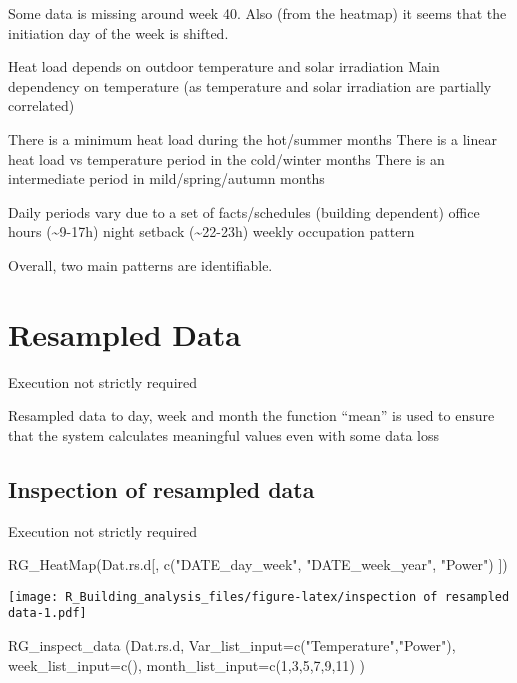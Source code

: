 \documentclass[
]{article}
\newenvironment{Shaded}{\begin{snugshade}}{\end{snugshade}}
\newcommand{\AttributeTok}[1]{\textcolor[rgb]{0.77,0.63,0.00}{#1}}
\newcommand{\DecValTok}[1]{\textcolor[rgb]{0.00,0.00,0.81}{#1}}
\newcommand{\FunctionTok}[1]{\textcolor[rgb]{0.00,0.00,0.00}{#1}}
\newcommand{\NormalTok}[1]{#1}
\newcommand{\StringTok}[1]{\textcolor[rgb]{0.31,0.60,0.02}{#1}}
\begin{document}
Some data is missing around week 40. Also (from the heatmap) it seems
that the initiation day of the week is shifted.

Heat load depends on outdoor temperature and solar irradiation Main
dependency on temperature (as temperature and solar irradiation are
partially correlated)

There is a minimum heat load during the hot/summer months There is a
linear heat load vs temperature period in the cold/winter months There
is an intermediate period in mild/spring/autumn months

Daily periods vary due to a set of facts/schedules (building dependent)
office hours (\textasciitilde9-17h) night setback
(\textasciitilde22-23h) weekly occupation pattern

Overall, two main patterns are identifiable.

\hypertarget{resampled-data}{%
\section{Resampled Data}\label{resampled-data}}

Execution not strictly required

Resampled data to day, week and month the function ``mean'' is used to
ensure that the system calculates meaningful values even with some data
loss

\hypertarget{inspection-of-resampled-data}{%
\subsection{Inspection of resampled
data}\label{inspection-of-resampled-data}}

Execution not strictly required

\begin{Shaded}
\begin{Highlighting}[]
  \FunctionTok{RG\_HeatMap}\NormalTok{(Dat.rs.d[,}
                      \FunctionTok{c}\NormalTok{(}\StringTok{"DATE\_day\_week"}\NormalTok{,}
                        \StringTok{"DATE\_week\_year"}\NormalTok{,}
                        \StringTok{"Power"}\NormalTok{)}
\NormalTok{  ])}
\end{Highlighting}
\end{Shaded}

\texttt{[image: R\_Building\_analysis\_files/figure-latex/inspection of resampled data-1.pdf]}

\begin{Shaded}
\begin{Highlighting}[]
  \FunctionTok{RG\_inspect\_data}\NormalTok{ (Dat.rs.d,}
                   \AttributeTok{Var\_list\_input=}\FunctionTok{c}\NormalTok{(}\StringTok{"Temperature"}\NormalTok{,}\StringTok{"Power"}\NormalTok{),}
                   \AttributeTok{week\_list\_input=}\FunctionTok{c}\NormalTok{(),}
                   \AttributeTok{month\_list\_input=}\FunctionTok{c}\NormalTok{(}\DecValTok{1}\NormalTok{,}\DecValTok{3}\NormalTok{,}\DecValTok{5}\NormalTok{,}\DecValTok{7}\NormalTok{,}\DecValTok{9}\NormalTok{,}\DecValTok{11}\NormalTok{)}
\NormalTok{  )}
\end{Highlighting}
\end{Shaded}
\end{document}
